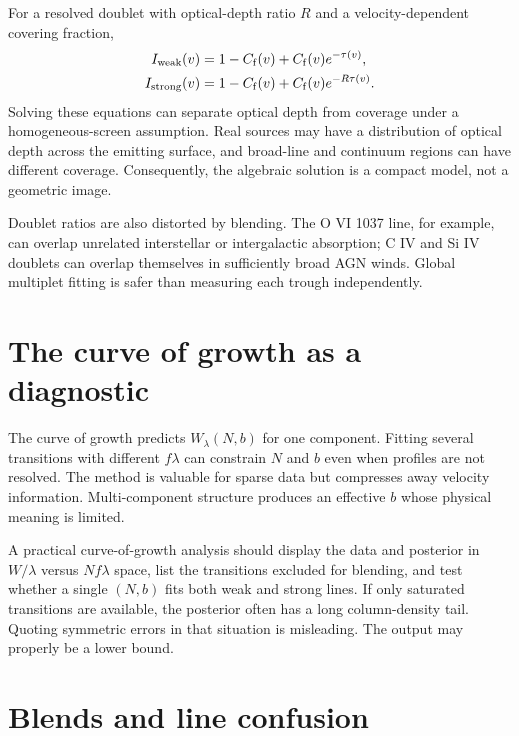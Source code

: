 For a resolved doublet with optical-depth ratio $R$ and a velocity-dependent
covering fraction,
\begin{align}
 I_{\rm weak}(v)&=1-C_{\rm f}(v)+C_{\rm f}(v)e^{-\tau(v)},\\
 I_{\rm strong}(v)&=1-C_{\rm f}(v)+C_{\rm f}(v)e^{-R\tau(v)}.
 \label{eq:partial-cover}
\end{align}
Solving these equations can separate optical depth from coverage under a
homogeneous-screen assumption. Real sources may have a distribution of
optical depth across the emitting surface, and broad-line and continuum
regions can have different coverage. Consequently, the algebraic solution is
a compact model, not a geometric image.

Doublet ratios are also distorted by blending. The O VI 1037 line, for
example, can overlap unrelated interstellar or intergalactic absorption; C IV
and Si IV doublets can overlap themselves in sufficiently broad AGN winds.
Global multiplet fitting is safer than measuring each trough independently.

\section{The curve of growth as a diagnostic}

The curve of growth predicts $W_\lambda(N,b)$ for one component. Fitting
several transitions with different $f\lambda$ can constrain $N$ and $b$ even
when profiles are not resolved. The method is valuable for sparse data but
compresses away velocity information. Multi-component structure produces an
effective $b$ whose physical meaning is limited.

A practical curve-of-growth analysis should display the data and posterior in
$W/\lambda$ versus $Nf\lambda$ space, list the transitions excluded for
blending, and test whether a single $(N,b)$ fits both weak and strong lines.
If only saturated transitions are available, the posterior often has a long
column-density tail. Quoting symmetric errors in that situation is
misleading. The output may properly be a lower bound.

\section{Blends and line confusion}

